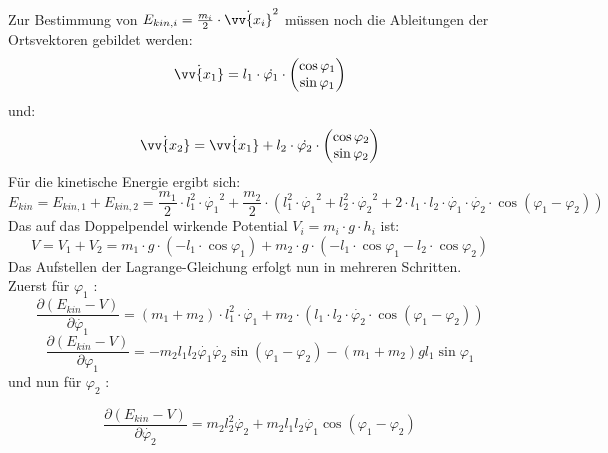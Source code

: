 Zur Bestimmung von $E_{kin,i} = \frac{m_i}{2} \cdot  \dot{\vv{x_i}}^2$  müssen noch die Ableitungen der Ortsvektoren gebildet werden:
\begin{equation}
\dot{\vv{x_1}} = l_1 \cdot \dot{\varphi_1} \cdot \begin{pmatrix}
\cos \varphi_1 \\ \sin \varphi_1
\end{pmatrix}
\end{equation}
und:
\begin{equation}
\dot{\vv{x_2}} = \dot{\vv{x_1}} + l_2 \cdot  \dot{\varphi_2} \cdot \begin{pmatrix}
\cos \varphi_2 \\ \sin \varphi_2
\end{pmatrix} 
\end{equation}
Für die kinetische Energie ergibt sich:
\begin{equation}
E_{kin} = E_{kin,1} + E_{kin,2} = \frac{m_1}{2} \cdot  l_1^2 \cdot  \dot{\varphi_1}^2 +
\frac{m_2}{2} \cdot (l_1^2 \cdot \dot{\varphi_1}^2 + l_2^2 \cdot \dot{\varphi_2}^2 + 2 \cdot l_1 \cdot l_2 \cdot \dot{\varphi_1} \cdot \dot{\varphi_2} \cdot \cos (\varphi_1 - \varphi_2))
\end{equation}
Das auf das Doppelpendel wirkende Potential $ V_i = m_i \cdot g \cdot h_i $ ist:
\begin{equation}
V = V_1 + V_2 = m_1 \cdot g \cdot (-l_1 \cdot \cos \varphi_1) + m_2 \cdot g \cdot (-l_1 \cdot \cos \varphi_1 - l_2 \cdot \cos \varphi_2)
\end{equation}
Das Aufstellen der Lagrange-Gleichung erfolgt nun in mehreren Schritten.\\ Zuerst für $ \varphi_1$ :
\begin{equation}
\frac{\partial (E_{kin} - V)}{\partial\dot{\varphi_1}} = (m_1 + m_2) \cdot l_1^2 \cdot \dot{\varphi_1} + m_2 \cdot (l_1 \cdot l_2 \cdot \dot{\varphi_2} \cdot \cos (\varphi_1 - \varphi_2)) 
\end{equation}
\begin{equation}
\frac{\partial (E_{kin} - V)}{\partial \varphi_1} = -m_2 l_1 l_2 \dot{\varphi_1} \dot{\varphi_2} \sin (\varphi_1 - \varphi_2) - (m_1 + m_2) g l_1 \sin \varphi_1
\end{equation}
und nun für $ \varphi_2 $ :

\begin{equation}
\frac{\partial (E_{kin} - V)}{\partial \dot{\varphi_2}} = m_2 l_2^2 \dot{\varphi_2} + m_2 l_1 l_2 \dot{\varphi_1} \cos (\varphi_1 - \varphi_2)
\end{equation}

